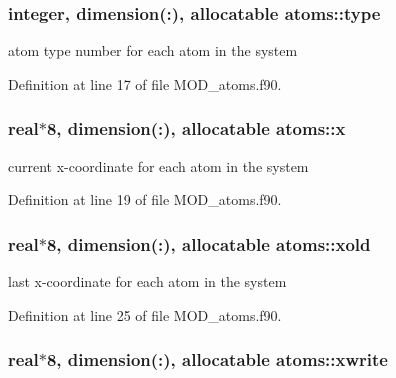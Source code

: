 \hypertarget{classatoms_a6394bcb06c217b3bd239a0b2a1514418}{
\subsubsection[{type}]{\setlength{\rightskip}{0pt plus 5cm}integer, dimension(\-:), allocatable atoms\-::type}}\label{classatoms_a6394bcb06c217b3bd239a0b2a1514418}


atom type number for each atom in the system 



Definition at line 17 of file M\-O\-D\-\_\-atoms.\-f90.

\hypertarget{classatoms_a9a9b5b4434a7f3b293a6d30a4f3bd0da}{
\subsubsection[{x}]{\setlength{\rightskip}{0pt plus 5cm}real$\ast$8, dimension(\-:), allocatable atoms\-::x}}\label{classatoms_a9a9b5b4434a7f3b293a6d30a4f3bd0da}


current x-\/coordinate for each atom in the system 



Definition at line 19 of file M\-O\-D\-\_\-atoms.\-f90.

\hypertarget{classatoms_a730121d9d8d50fa1cd0726b94a4036cd}{
\subsubsection[{xold}]{\setlength{\rightskip}{0pt plus 5cm}real$\ast$8, dimension(\-:), allocatable atoms\-::xold}}\label{classatoms_a730121d9d8d50fa1cd0726b94a4036cd}


last x-\/coordinate for each atom in the system 



Definition at line 25 of file M\-O\-D\-\_\-atoms.\-f90.

\hypertarget{classatoms_a85f7d7d7038edcecede7d6e99dfaccb3}{
\subsubsection[{xwrite}]{\setlength{\rightskip}{0pt plus 5cm}real$\ast$8, dimension(\-:), allocatable atoms\-::xwrite}}\label{classatoms_a85f7d7d7038edcecede7d6e99dfaccb3}


